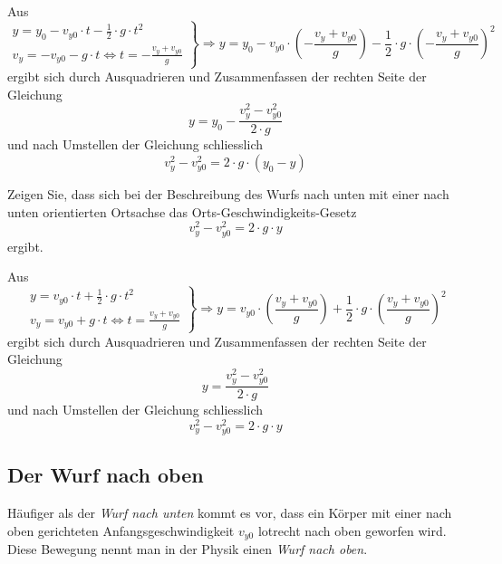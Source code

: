 \begin{solution}
Aus
\[ \left.\begin{array}{r} y=y_{0} - v_{y0} \cdot t - \frac{1}{2} \cdot  g \cdot t^{2} \\ v_{y} = - v_{y0} -g \cdot t \Leftrightarrow t = - \frac{v_{y} + v_{y0}}{g} \end{array} \right\} \Rightarrow y= y_{0} - v_{y0} \cdot \left( - \frac{v_{y} + v_{y0}}{g} \right) - \frac{1}{2} \cdot g \cdot \left( - \frac{v_{y} + v_{y0}}{g} \right)^{2} \]
ergibt sich durch Ausquadrieren und Zusammenfassen der rechten Seite der Gleichung
\[ y=y_{0} - \frac{v_{y}^{2} - v_{y0}^{2}}{2 \cdot g} \]
und nach Umstellen der Gleichung schliesslich
\[ v_{y}^{2} - v_{y0}^{2} = 2 \cdot g \cdot (y_{0} - y) \]
\end{solution}

\begin{example}
Zeigen Sie, dass sich bei der Beschreibung des Wurfs nach unten mit einer nach unten orientierten Ortsachse das Orts-Geschwindigkeits-Gesetz
\[ v_{y}^{2} - v_{y0}^{2} = 2 \cdot g \cdot  y \]
ergibt.
\end{example}

\begin{solution}
Aus
\[ \left.\begin{array}{r} y=v_{y0} \cdot t + \frac{1}{2} \cdot  g \cdot t^{2} \\ v_{y} = v_{y0} +g \cdot t \Leftrightarrow t =  \frac{v_{y} + v_{y0}}{g} \end{array} \right\} \Rightarrow y= v_{y0} \cdot \left( \frac{v_{y} + v_{y0}}{g} \right) + \frac{1}{2} \cdot g \cdot \left( \frac{v_{y} + v_{y0}}{g} \right)^{2} \]
ergibt sich durch Ausquadrieren und Zusammenfassen der rechten Seite der Gleichung
\[ y=\frac{v_{y}^{2} - v_{y0}^{2}}{2 \cdot g} \]
und nach Umstellen der Gleichung schliesslich
\[ v_{y}^{2} - v_{y0}^{2} = 2 \cdot g \cdot  y \]
\end{solution}

\subsection{Der Wurf nach oben}
Häufiger als der \textit{Wurf nach unten} kommt es vor, dass ein Körper mit einer nach oben gerichteten Anfangsgeschwindigkeit $v_{y0}$ lotrecht nach oben geworfen wird. Diese Bewegung nennt man in der Physik einen \textit{Wurf nach oben}.

